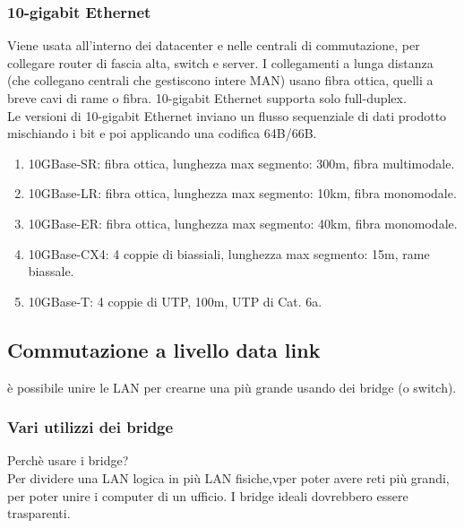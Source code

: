 \documentclass{article}
\begin{document}
\subsubsection{10-gigabit Ethernet}
Viene usata all'interno dei datacenter e nelle centrali di commutazione, per collegare router di fascia alta, switch e server. I collegamenti a lunga distanza (che collegano centrali che gestiscono intere MAN) usano fibra ottica, quelli a breve cavi di rame o fibra.
10-gigabit Ethernet supporta solo full-duplex. \\
Le versioni di 10-gigabit Ethernet inviano un flusso sequenziale di dati prodotto mischiando i bit e poi applicando una codifica 64B/66B.
\begin{enumerate}
\item 10GBase-SR: fibra ottica, lunghezza max segmento: 300m, fibra multimodale.
\item 10GBase-LR: fibra ottica, lunghezza max segmento: 10km, fibra monomodale.
\item 10GBase-ER: fibra ottica, lunghezza max segmento: 40km, fibra monomodale.
\item 10GBase-CX4: 4 coppie di biassiali, lunghezza max segmento: 15m, rame biassale.
\item 10GBase-T: 4 coppie di UTP, 100m, UTP di Cat. 6a.
\end{enumerate}

\subsection{Commutazione a livello data link}
è possibile unire le LAN per crearne una più grande usando dei bridge (o switch).
\subsubsection{Vari utilizzi dei bridge}
Perchè usare i bridge? \\
Per dividere una LAN logica in più LAN fisiche,vper poter avere reti più grandi, per poter unire i computer di un ufficio.
I bridge ideali dovrebbero essere trasparenti. 
\end{document}
